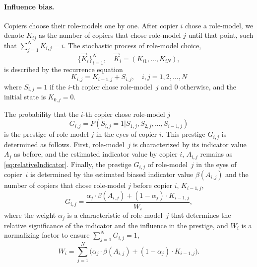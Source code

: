\documentclass[11pt]{article}
\begin{document}
\paragraph{Influence bias.}
Copiers choose their role-models one by one.
After copier $i$ chose a role-model, we denote $K_{ij}$ as the number of copiers that chose role-model $j$ until that point, such that $\sum_{j=1}^N{K_{i,j}} = i$. 
The stochastic process of role-model choice, 
\begin{equation} \label{eq:process}
\big\{\vec{K}_i\big\}_{i=1}^N, \quad \vec{K}_i=(K_{i1}, \ldots, K_{iN}),
\end{equation}
is described by the recurrence equation
\begin{equation} \label{eq:recurrence}
K_{i,j} = K_{i-1,j} + S_{i,j}, \quad i,j=1,2,\ldots,N
\end{equation}
where $S_{i,j}=1$ if the $i$-th copier chose role-model~$j$ and 0 otherwise, and the initial state is $K_{0,j}=0$.

The probability that the $i$-th copier chose role-model $j$
\begin{equation}\label{eq:recPrestige}
G_{i,j}=P(S_{i,j}=1| S_{1,j},S_{2,j},...,S_{i-1,j})
\end{equation}
is the prestige of role-model $j$ in the eyes of copier $i$.
This prestige $G_{i,j}$ is determined as follows.
First, role-model~$j$ is characterized by its indicator value $A_j$ as before, and the estimated indicator value by copier $i$, $A_{i,j}$ remains as \cref{eq:relativeIndicator}.
Finally, the prestige $G_{i,j}$ of role-model~$j$ in the eyes of copier~$i$ is determined by the estimated biased indicator value $\beta(A_{i,j})$ and the number of copiers that chose role-model $j$ before copier $i$, $K_{i-1,j}$, 
\begin{equation}\label{prestige_eq}
G_{i,j} = \frac{\alpha_j \cdot \beta(A_{i,j}) + (1-\alpha_j) \cdot K_{i-1,j}}{W_i},
\end{equation}
where the weight $\alpha_j$ is a characteristic of role-model~$j$ that determines the relative significance of the indicator and the influence in the prestige, and $W_i$ is a normalizing factor to ensure $\sum_{j=1}^N{G_{i,j}}=1$,
\begin{equation}
W_i = \sum_{j=1}^N{\Big(\alpha_j \cdot \beta(A_{i,j}) + (1-\alpha_j) \cdot K_{i-1,j}\Big)}.
\end{equation}
\end{document}
